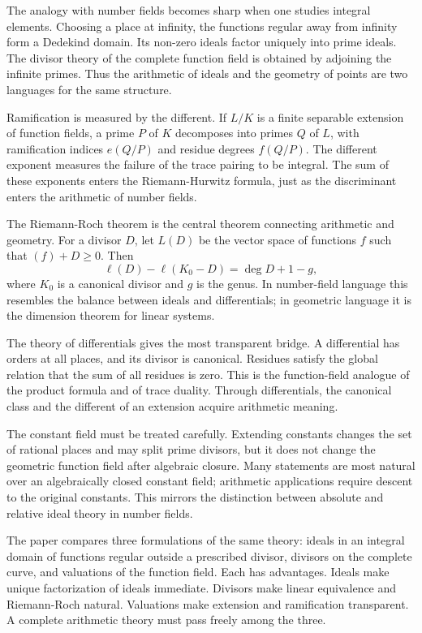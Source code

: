 \documentclass[11pt]{article}
\begin{document}
The analogy with number fields becomes sharp when one studies integral elements. Choosing a place at
infinity, the functions regular away from infinity form a Dedekind domain. Its non-zero ideals
factor uniquely into prime ideals. The divisor theory of the complete function field is obtained by
adjoining the infinite primes. Thus the arithmetic of ideals and the geometry of points are two
languages for the same structure.


Ramification is measured by the different. If \(L/K\) is a finite separable extension of function
fields, a prime \(P\) of \(K\) decomposes into primes \(Q\) of \(L\), with ramification indices
\(e(Q/P)\) and residue degrees \(f(Q/P)\). The different exponent measures the failure of the trace
pairing to be integral. The sum of these exponents enters the Riemann-Hurwitz formula, just as the
discriminant enters the arithmetic of number fields.


The Riemann-Roch theorem is the central theorem connecting arithmetic and geometry. For a divisor
\(D\), let \(L(D)\) be the vector space of functions \(f\) such that \((f)+D\geq 0\). Then \[
\ell(D)-\ell(K_0-D)=\deg D+1-g, \] where \(K_0\) is a canonical divisor and \(g\) is the genus. In
number-field language this resembles the balance between ideals and differentials; in geometric
language it is the dimension theorem for linear systems.


The theory of differentials gives the most transparent bridge. A differential has orders at all
places, and its divisor is canonical. Residues satisfy the global relation that the sum of all
residues is zero. This is the function-field analogue of the product formula and of trace duality.
Through differentials, the canonical class and the different of an extension acquire arithmetic
meaning.


The constant field must be treated carefully. Extending constants changes the set of rational places
and may split prime divisors, but it does not change the geometric function field after algebraic
closure. Many statements are most natural over an algebraically closed constant field; arithmetic
applications require descent to the original constants. This mirrors the distinction between
absolute and relative ideal theory in number fields.


The paper compares three formulations of the same theory: ideals in an integral domain of functions
regular outside a prescribed divisor, divisors on the complete curve, and valuations of the function
field. Each has advantages. Ideals make unique factorization of ideals immediate. Divisors make
linear equivalence and Riemann-Roch natural. Valuations make extension and ramification transparent.
A complete arithmetic theory must pass freely among the three.
\end{document}
